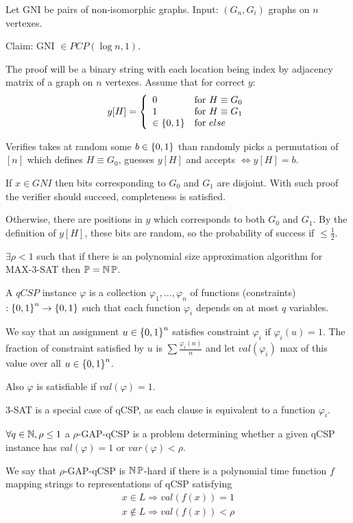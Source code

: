\begin{example}
	Let GNI be pairs of non-isomorphic graphs.
	Input: $(G_n, G_i)$ graphs on $n$ vertexes.

	Claim: GNI $\in PCP (\log n, 1)$.

	The proof will be a binary string with each location being index by adjacency matrix of a graph on $n$ vertexes.
	Assume that for correct $y$:
	\[ y[H] = \left\{ \begin{array}{lll} 0 & \mbox{for } H \equiv G_0 \\ 1 & \mbox{for } H \equiv G_1 \\  \in \operatorname{\{ 0, 1 \}} & \mbox{for } else \end{array} \right. \]

	Verifies takes at random some $b \in \operatorname{\{ 0, 1 \}}$ than randomly picks a permutation of $[n]$ which defines $H \equiv G_0$, guesses $y[H]$ and accepts $\iff y[H] = b$.

	If $x \in GNI$ then bits corresponding to $G_0$ and $G_1$ are disjoint.
	With such proof the verifier should succeed, completeness is satisfied.

	Otherwise, there are positions in $y$ which corresponds to both $G_0$ and $G_1$.
	By the definition of $y[H]$, these bits are random, so the probability of success if $\leq \frac{1}{2}$.
\end{example}

\begin{corollary}
	$\exists \rho < 1$ such that if there is an polynomial size approximation algorithm for MAX-3-SAT then $\operatorname{\mathbb{P}} = \operatorname{\operatorname{\mathbb{N}}\mathbb{P}}$.
\end{corollary}

\begin{definition}[qCSP]
	A $qCSP$ instance $\varphi$ is a collection $\varphi_1, \ldots, \varphi_n$ of functions (constraints)$:\operatorname{\{ 0, 1 \}}^n \to \operatorname{\{ 0, 1 \}}$ such that each function $\varphi_i$ depends on at most $q$ variables.

	We say that an assignment $u \in \operatorname{\{ 0, 1 \}}^n$ satisfies constraint $\varphi_i$ if $\varphi_i(u) = 1$.
	The fraction of constraint satisfied by $u$ is $\sum \frac{\varphi_i(n)}{n}$ and let $val(\varphi_i)$ max of this value over all $u \in \operatorname{\{ 0, 1 \}}^n$.

	Also $\varphi$ is satisfiable if $val(\varphi) = 1$.

	3-SAT is a special case of qCSP, as each clause is equivalent to a function $\varphi_i$.
\end{definition}

\begin{definition}
	$\forall q \in \operatorname{\mathbb{N}}, \rho \leq 1$ a $\rho$-GAP-qCSP is a problem determining whether a given qCSP instance has $val(\varphi) = 1$ or $var(\varphi) < \rho$.

	We say that $\rho$-GAP-qCSP is $\operatorname{\operatorname{\mathbb{N}}\mathbb{P}}$-hard if there is a polynomial time function $f$ mapping strings to representations of qCSP satisfying
	\begin{gather*}
		x \in L \Rightarrow val(f(x)) = 1 \\
		x \notin L \Rightarrow val(f(x)) < \rho
	\end{gather*}
\end{definition}

